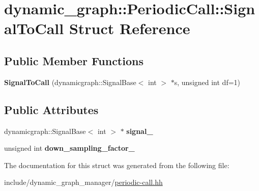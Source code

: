 \hypertarget{structdynamic__graph_1_1PeriodicCall_1_1SignalToCall}{}\section{dynamic\+\_\+graph\+:\+:Periodic\+Call\+:\+:Signal\+To\+Call Struct Reference}
\label{structdynamic__graph_1_1PeriodicCall_1_1SignalToCall}
\subsection*{Public Member Functions}
\begin{DoxyCompactItemize}
\item 
\mbox{\label{structdynamic__graph_1_1PeriodicCall_1_1SignalToCall_a9efbb8370bdb3ebadb9ee9e8f4a6c209}} 
{\bfseries Signal\+To\+Call} (dynamicgraph\+::\+Signal\+Base$<$ int $>$ $\ast$s, unsigned int df=1)
\end{DoxyCompactItemize}
\subsection*{Public Attributes}
\begin{DoxyCompactItemize}
\item 
\mbox{\label{structdynamic__graph_1_1PeriodicCall_1_1SignalToCall_aa4ca46512452a1107926da8a92803597}} 
dynamicgraph\+::\+Signal\+Base$<$ int $>$ $\ast$ {\bfseries signal\+\_\+}
\item 
\mbox{\label{structdynamic__graph_1_1PeriodicCall_1_1SignalToCall_aae29661d7a6753e2bd60565ce2a7d146}} 
unsigned int {\bfseries down\+\_\+sampling\+\_\+factor\+\_\+}
\end{DoxyCompactItemize}


The documentation for this struct was generated from the following file\+:\begin{DoxyCompactItemize}
\item 
include/dynamic\+\_\+graph\+\_\+manager/\hyperlink{periodic-call_8hh}{periodic-\/call.\+hh}\end{DoxyCompactItemize}
